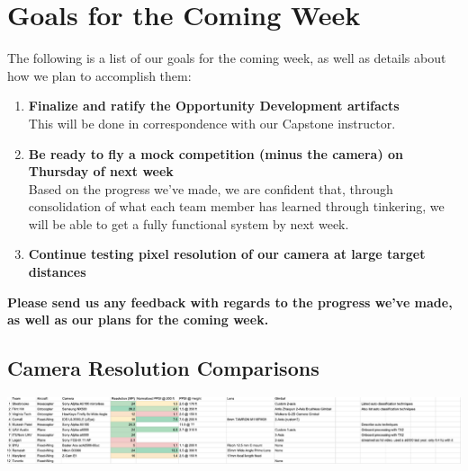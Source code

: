 \documentclass[]{../auvsi_doc}
\begin{document}
\section{Goals for the Coming Week}

The following is a list of our goals for the coming week, as well as details about how we plan to accomplish them:

\begin{enumerate}
\item \textbf{Finalize and ratify the Opportunity Development artifacts}\\
This will be done in correspondence with our Capstone instructor.
\item \textbf{Be ready to fly a mock competition (minus the camera) on Thursday of next week}\\
Based on the progress we've made, we are confident that, through consolidation of what each team member has learned through tinkering, we will be able to get a fully functional system by next week.
\item \textbf{Continue testing pixel resolution of our camera at large target distances}
\end{enumerate}

\textbf{Please send us any feedback with regards to the progress we've made, as well as our plans for the coming week.}

\newpage
\begin{appendices}

\section{Camera Resolution Comparisons}
\label{appendix:cameragraphic}
\begin{center}
	\includegraphics[width=\textwidth]{camera_graphic.pdf}
\end{center}

\end{appendices}
\end{document}
